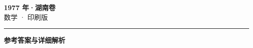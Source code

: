 \documentclass[zihao=5, a4paper]{ctexart}
\begin{document}
\begin{center}
  {\Large\bfseries 1977 年·湖南卷}\\[4pt]
  {\large 数学 · 印刷版}
\end{center}
\medskip
{}

\par\bigskip\hrule\bigskip
{}
\begin{center}{\large\bfseries 参考答案与详细解析}\end{center}
\smallskip

\end{document}
